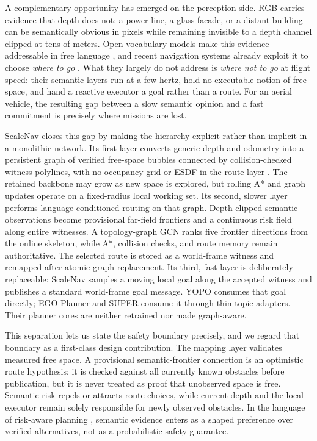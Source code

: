 \documentclass[letterpaper,10pt,conference]{ieeeconf}
\begin{document}
A complementary opportunity has emerged on the perception side.  RGB carries
evidence that depth does not: a power line, a glass facade, or a distant
building can be semantically obvious in pixels while remaining invisible to a
depth channel clipped at tens of meters.  Open-vocabulary models make this
evidence addressable in free language
\cite{clip,lseg,openseg,pearl}, and recent navigation systems already exploit
it to choose \emph{where to go} \cite{vlfm,rayfronts}.
What they largely do not address is \emph{where not to go} at flight speed:
their semantic layers run at a few hertz, hold no executable notion of free
space, and hand a reactive executor a goal rather than a route.  For an aerial
vehicle, the resulting gap between a slow semantic opinion and a fast
commitment is precisely where missions are lost.

ScaleNav closes this gap by making the hierarchy explicit rather than
implicit in a monolithic network.  Its first layer converts generic depth and
odometry into a persistent graph of verified free-space bubbles connected by
collision-checked witness polylines, with no occupancy grid or ESDF in the
route layer \cite{bubble,epic}.  The retained backbone may grow as new space is
explored, but rolling A* and graph updates operate on a fixed-radius local
working set.  Its second, slower layer performs language-conditioned routing
on that graph.  Depth-clipped semantic observations become provisional
far-field frontiers and a continuous risk field along entire witnesses.  A
topology-graph GCN ranks five frontier directions from the online skeleton,
while A*,
collision checks, and route memory remain authoritative.  The selected route
is stored as a world-frame witness and remapped after atomic graph replacement.
Its third, fast layer is deliberately replaceable: ScaleNav samples a moving
local goal along the accepted witness and publishes a standard world-frame
goal message.  YOPO \cite{yopo} consumes that goal directly; EGO-Planner and
SUPER consume it through thin topic adapters.  Their planner cores are neither
retrained nor made graph-aware.

This separation lets us state the safety boundary precisely, and we regard
that boundary as a first-class design contribution.  The mapping layer
validates measured free space.  A provisional semantic-frontier connection is
an optimistic route hypothesis: it is checked against all currently known
obstacles before publication, but it is never treated as proof that
unobserved space is free.  Semantic risk repels or attracts route choices,
while current depth and the local executor remain solely responsible for
newly observed obstacles.  In the language of risk-aware planning
\cite{blackmore}, semantic evidence enters as a shaped preference
over verified alternatives, not as a probabilistic safety guarantee.
\end{document}

